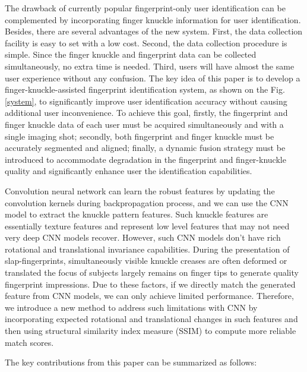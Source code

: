 The drawback of currently popular fingerprint-only user identification can be complemented by incorporating finger knuckle information for user identification. Besides, there are several advantages of the new system. First, the data collection facility is easy to set with a low cost. Second, the data collection procedure is simple. Since the finger knuckle and fingerprint data can be collected simultaneously, no extra time is needed. Third, users will have almost the same user experience without any confusion. The key idea of this paper is to develop a finger-knuckle-assisted fingerprint identification system, as shown on the Fig. \ref{system}, to significantly improve user identification accuracy without causing additional user inconvenience. To achieve this goal, firstly, the fingerprint and finger knuckle data of each user must be acquired simultaneously and with a single imaging shot; secondly, both fingerprint and finger knuckle must be accurately segmented and aligned; finally, a dynamic fusion strategy must be introduced to accommodate degradation in the fingerprint and finger-knuckle quality and significantly enhance user the identification capabilities.

Convolution neural network can learn the robust features by updating the convolution kernels during backpropagation process, and we can use the CNN model to extract the knuckle pattern features. Such knuckle features are essentially texture features and represent low level features that may not need very deep CNN models recover. However, such CNN models don't \cite{jaderberg2015spatial} have rich rotational and translational invariance capabilities. During the presentation of slap-fingerprints, simultaneously visible knuckle creases are often deformed or translated the focus of subjects largely remains on finger tips to generate quality fingerprint impressions. Due to these factors, if we directly match the generated feature from CNN models, we can only achieve limited performance. Therefore, we introduce a new method to address such limitations with CNN by incorporating expected rotational and translational changes in such features and then using structural similarity index measure (SSIM) \cite{wang2004image} to compute more reliable match scores. 


The key contributions from this paper can be summarized as follows: 

